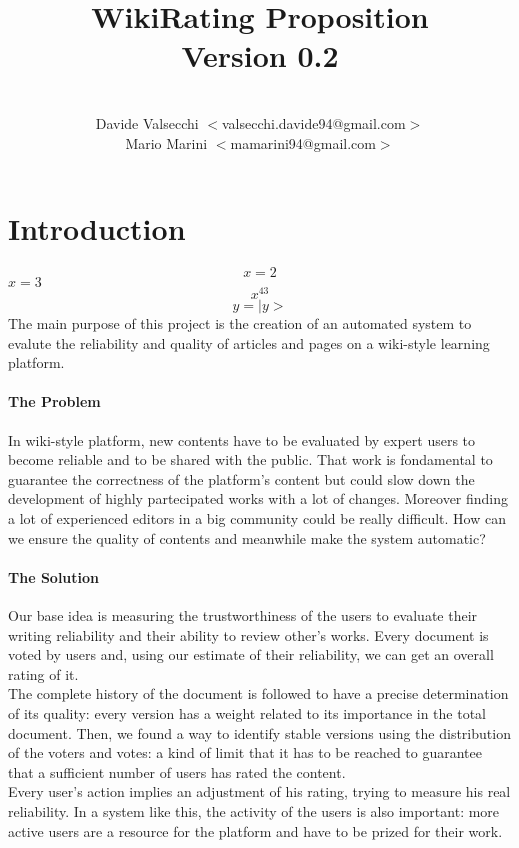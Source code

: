 \documentclass[a4paper,11pt]{article}
\title{\textbf{WikiRating Proposition\\Version 0.2}}
\author{\\Davide Valsecchi $<$valsecchi.davide94@gmail.com$>$
\\Mario Marini $<$mamarini94@gmail.com$>$}
\newcommand{\bra}[1]{|#1>}
\begin{document}
\maketitle
\newpage
\tableofcontents
\newpage

\section{Introduction}

$$x = 2$$
$x=3$
\begin{equation}
x^43
\end{equation}
$$ y = \bra{y} $$
The main purpose of this project is the creation of an automated system to evalute the reliability and quality of articles and pages on a wiki-style learning platform.
\paragraph{The Problem}
In wiki-style platform, new contents have to be evaluated by expert users to become reliable and to be shared with the public. That work is fondamental to guarantee the
correctness of the platform's content but could slow down the development of highly
partecipated works with a lot of changes. Moreover finding a lot of experienced editors  
in a big community could be really difficult. How can we ensure the quality of contents 
and meanwhile make the system automatic?
\paragraph{The Solution}
Our base idea is measuring the trustworthiness of the users to evaluate their writing reliability and their ability to review other's works. Every document is voted by users and, using our estimate of their reliability, we can get an overall rating of it. 
\\The complete history of the document is followed to have a precise determination of its quality: every version has a weight related to its importance in the total document. Then, we found a way to identify stable versions using the distribution of the voters and votes: a kind of limit that it has to be reached to guarantee that a sufficient number of users has rated the content. 
\\Every user's action implies an adjustment of his rating, trying to measure his real reliability. In a system like this, the activity of the users is also important: more active users are a resource for the platform and have to be prized for their work.
\end{document}
